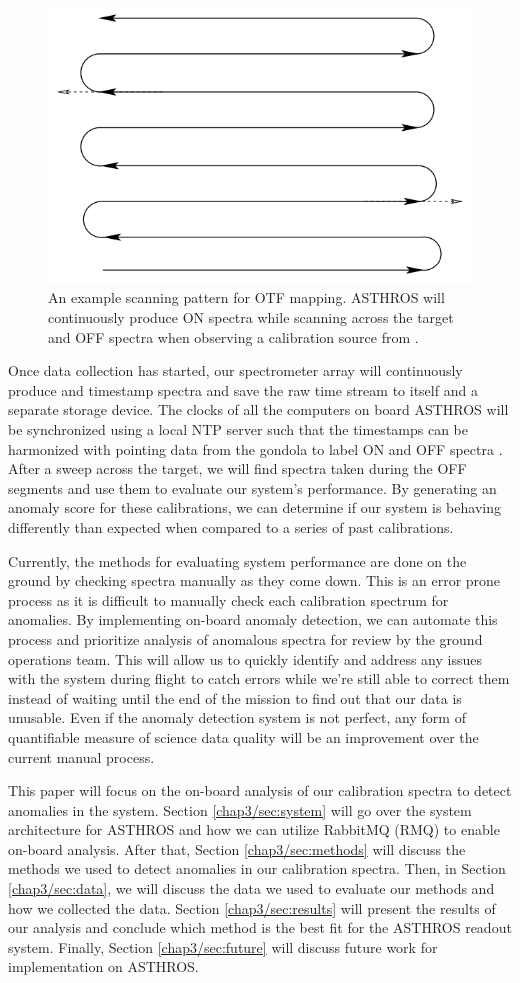 \begin{figure}[h]
    \centering
    \includegraphics[width=0.5\linewidth]{figs/3/scan.png}
    \caption{An example scanning pattern for OTF mapping. ASTHROS will continuously produce ON spectra while scanning across the target and OFF spectra when observing a calibration source from \cite[Mangum, JG 2007]{mangum2007fly}.}
    \label{chap3/fig:scan}
\end{figure}

Once data collection has started, our spectrometer array will continuously produce and timestamp spectra and save the raw time stream to itself and a separate storage device. 
The clocks of all the computers on board ASTHROS will be synchronized using a local NTP server such that the timestamps can be harmonized with pointing data from the gondola to label ON and OFF spectra \cite{mills1991internet}.
After a sweep across the target, we will find spectra taken during the OFF segments and use them to evaluate our system's performance.
By generating an anomaly score for these calibrations, we can determine if our system is behaving differently than expected when compared to a series of past calibrations.

Currently, the methods for evaluating system performance are done on the ground by checking spectra manually as they come down.
This is an error prone process as it is difficult to manually check each calibration spectrum for anomalies.
By implementing on-board anomaly detection, we can automate this process and prioritize analysis of anomalous spectra for review by the ground operations team.
This will allow us to quickly identify and address any issues with the system during flight to catch errors while we're still able to correct them instead of waiting until the end of the mission to find out that our data is unusable.
Even if the anomaly detection system is not perfect, any form of quantifiable measure of science data quality will be an improvement over the current manual process.


This paper will focus on the on-board analysis of our calibration spectra to detect anomalies in the system.
Section \ref{chap3/sec:system} will go over the system architecture for ASTHROS and how we can utilize RabbitMQ (RMQ) to enable on-board analysis.
After that, Section \ref{chap3/sec:methods} will discuss the methods we used to detect anomalies in our calibration spectra.
Then, in Section \ref{chap3/sec:data}, we will discuss the data we used to evaluate our methods and how we collected the data.
Section \ref{chap3/sec:results} will present the results of our analysis and conclude which method is the best fit for the ASTHROS readout system.
Finally, Section \ref{chap3/sec:future} will discuss future work for implementation on ASTHROS. 

